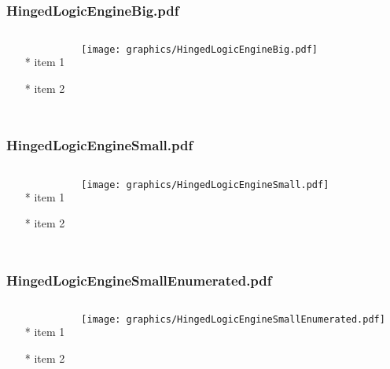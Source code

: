\documentclass{beamer}
\begin{document}
\begin{frame} \frametitle{HingedLogicEngineBig.pdf}
    \begin{columns}[c]
        \begin{itemize}
            \item[*] item 1
            \item[*] item 2
        \end{itemize}
        \begin{minipage}{\linewidth}
            \begin{center}
            \texttt{[image: graphics/HingedLogicEngineBig.pdf]}
            \label{gfx:HingedLogicEngineBig.pdf}
            \end{center}
        \end{minipage}
    \end{columns}
\end{frame}
\begin{frame} \frametitle{HingedLogicEngineSmall.pdf}
    \begin{columns}[c]
        \begin{itemize}
            \item[*] item 1
            \item[*] item 2
        \end{itemize}
        \begin{minipage}{\linewidth}
            \begin{center}
            \texttt{[image: graphics/HingedLogicEngineSmall.pdf]}
            \label{gfx:HingedLogicEngineSmall.pdf}
            \end{center}
        \end{minipage}
    \end{columns}
\end{frame}
\begin{frame} \frametitle{HingedLogicEngineSmallEnumerated.pdf}
    \begin{columns}[c]
        \begin{itemize}
            \item[*] item 1
            \item[*] item 2
        \end{itemize}
        \begin{minipage}{\linewidth}
            \begin{center}
            \texttt{[image: graphics/HingedLogicEngineSmallEnumerated.pdf]}
            \label{gfx:HingedLogicEngineSmallEnumerated.pdf}
            \end{center}
        \end{minipage}
    \end{columns}
\end{frame}
\end{document}
